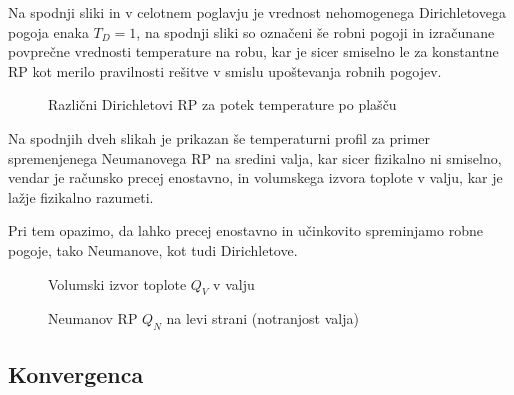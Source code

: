 Na spodnji sliki in v celotnem poglavju je vrednost nehomogenega Dirichletovega pogoja enaka $T_D=1$, na spodnji sliki so označeni še robni pogoji in izračunane povprečne vrednosti temperature na robu, kar je sicer smiselno le za konstantne RP kot merilo pravilnosti rešitve v smislu upoštevanja robnih pogojev.

\begin{figure}[H]
    \centering

    \caption{Različni Dirichletovi RP za potek temperature po plašču}
\end{figure}

Na spodnjih dveh slikah je prikazan še temperaturni profil za primer spremenjenega Neumanovega RP na sredini valja, kar sicer fizikalno ni smiselno, vendar je računsko precej enostavno, in volumskega izvora toplote v valju, kar je lažje fizikalno razumeti.

Pri tem opazimo, da lahko precej enostavno in učinkovito spreminjamo robne pogoje, tako Neumanove, kot tudi Dirichletove.

\begin{figure}[ht]
    \centering

    \caption{Volumski izvor toplote $Q_V$ v valju}
\end{figure}

\begin{figure}[H]
    \centering

    \caption{Neumanov RP $Q_N$ na levi strani (notranjost valja)}
\end{figure}

\subsection{Konvergenca}

